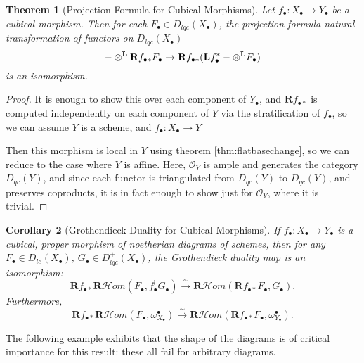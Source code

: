 \documentclass[proquest]{uwthesis}[2014/11/13]
\newtheorem{theorem}{Theorem}[section]
\newtheorem{cor}[theorem]{Corollary}
\theoremstyle{definition}
\newcommand{\cHom}{\mathcal{H} \textit{om}}
\newcommand{\bL}{\textbf{L}}
\newcommand{\OO}{\mathcal{O}}
\newcommand{\bR}{\textbf{R}}
\newcommand{\otimesL}{\otimes^{\bf L}}
\begin{document}
\begin{theorem}[Projection Formula for Cubical Morphisms]
	\label{thm:projectionformula}
	Let $f_\bullet : X_\bullet \rightarrow Y_\bullet$ be a cubical morphism.
	Then for each $F_\bullet \in D_{lqc}(X_\bullet)$, the projection formula natural transformation of functors on $D_{lqc}(X_\bullet)$
	\[
	- \otimesL \bR f_{\bullet *} F_\bullet \rightarrow \bR f_{\bullet *}(\bL f_\bullet^* - \otimesL F_\bullet)
	\]
	is an isomorphism.
\end{theorem}
\begin{proof}	
	It is enough to show this over each component of $Y_\bullet$, and $\bR f_{\bullet *}$ is computed independently on each component of $Y$ via the stratification of $f_\bullet$, so we can assume $Y$ is a scheme, and $f_\bullet : X_\bullet \rightarrow Y$
	
	Then this morphism is local in $Y$ using theorem \ref{thm:flatbasechange}, so we can reduce to the case where $Y$ is affine.
	Here, $\OO_Y$ is ample and generates the category $D_{qc}(Y)$, and since each functor is triangulated from $D_{qc}(Y)$ to $D_{qc}(Y)$, and preserves coproducts, it is in fact enough to show just for $\OO_Y$, where it is trivial.
\end{proof}

\begin{cor}[Grothendieck Duality for Cubical Morphisms]
	\label{cor:cubicalgrothdual}
	If $f_\bullet : X_\bullet \rightarrow Y_\bullet$ is a cubical, proper morphism of noetherian diagrams of schemes, then for any $F_\bullet \in D_{lc}^-(X_\bullet)$, $G_\bullet \in D_{lqc}^+(X_\bullet)$, the Grothendieck duality map is an isomorphism:
	\[
		\bR f_{\bullet *} \bR \cHom(F_\bullet, f_\bullet^! G_\bullet) \xrightarrow{\sim} \bR \cHom(\bR f_{\bullet *} F_\bullet, G_\bullet).
	\]
	Furthermore,
	\[
		\bR f_{\bullet *} \bR \cHom(F_\bullet, \omega_{X_\bullet}^\bullet) \xrightarrow{\sim} \bR \cHom(\bR f_{\bullet *} F_\bullet, \omega_{Y_\bullet}^\bullet).
	\]
\end{cor}

The following example exhibits that the shape of the diagrams is of critical importance for this result: these all fail for arbitrary diagrams.
\end{document}
